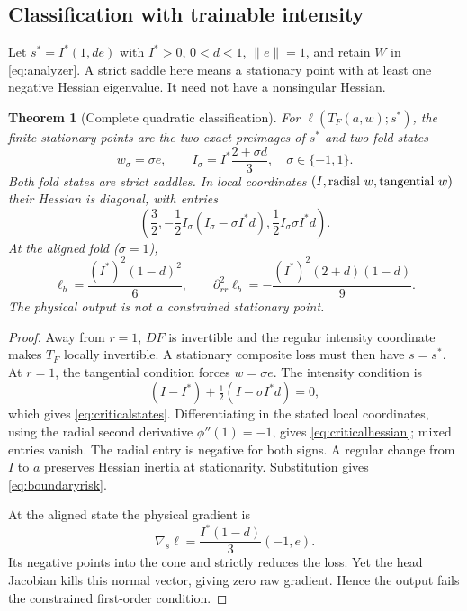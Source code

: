 \documentclass[10pt,a4paper]{article}
\newtheorem{theorem}{Theorem}
\begin{document}
\subsection{Classification with trainable intensity}
Let $s^*=I^*(1,de)$ with $I^*>0$, $0<d<1$, $\|e\|=1$, and retain $W$ in \eqref{eq:analyzer}. A strict saddle here means a stationary point with at least one negative Hessian eigenvalue. It need not have a nonsingular Hessian.

\begin{theorem}[Complete quadratic classification]
\label{thm:classification}
For $\ell(T_F(a,w);s^*)$, the finite stationary points are the two exact preimages of $s^*$ and two fold states
\begin{equation}
 w_\sigma=\sigma e,\qquad I_\sigma=I^*\frac{2+\sigma d}{3},
 \quad\sigma\in\{-1,1\}.
 \label{eq:criticalstates}
\end{equation}
Both fold states are strict saddles. In local coordinates $(I,\hbox{radial }w,\hbox{tangential }w)$ their Hessian is diagonal, with entries
\begin{equation}
 \left(\frac32,
 -\frac12 I_\sigma(I_\sigma-\sigma I^*d),
 \frac12 I_\sigma\sigma I^*d\right).
 \label{eq:criticalhessian}
\end{equation}
At the aligned fold ($\sigma=1$),
\begin{equation}
 \ell_b=\frac{(I^*)^2(1-d)^2}{6},\qquad
 \partial_{rr}^2\ell_b=-\frac{(I^*)^2(2+d)(1-d)}9.
 \label{eq:boundaryrisk}
\end{equation}
The physical output is not a constrained stationary point.
\end{theorem}
\begin{proof}
Away from $r=1$, $DF$ is invertible and the regular intensity coordinate makes $T_F$ locally invertible. A stationary composite loss must then have $s=s^*$. At $r=1$, the tangential condition forces $w=\sigma e$. The intensity condition is
\begin{equation*}
 (I-I^*)+\tfrac12(I-\sigma I^*d)=0,
\end{equation*}
which gives \eqref{eq:criticalstates}. Differentiating in the stated local coordinates, using the radial second derivative $\phi''(1)=-1$, gives \eqref{eq:criticalhessian}; mixed entries vanish. The radial entry is negative for both signs. A regular change from $I$ to $a$ preserves Hessian inertia at stationarity. Substitution gives \eqref{eq:boundaryrisk}.

At the aligned state the physical gradient is
\begin{equation*}
 \nabla_s\ell=\frac{I^*(1-d)}3(-1,e).
\end{equation*}
Its negative points into the cone and strictly reduces the loss. Yet the head Jacobian kills this normal vector, giving zero raw gradient. Hence the output fails the constrained first-order condition.
\end{proof}
\end{document}
